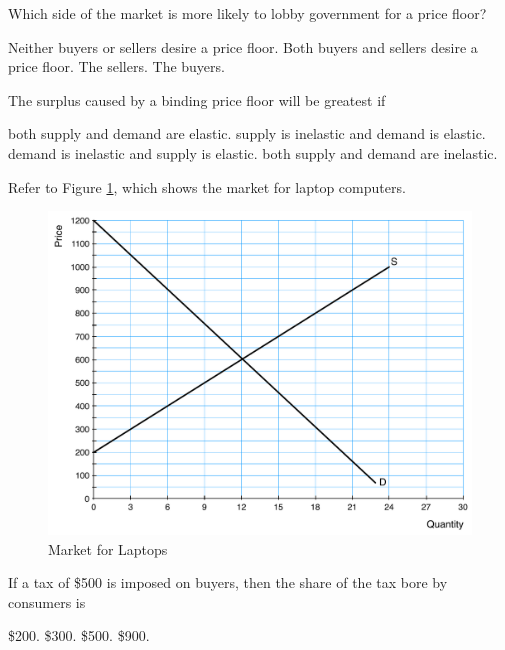\documentclass[addpoints,11pt]{exam}
\theoremstyle{definition}
\begin{document}
\begin{questions}
\question Which side of the market is more likely to lobby government for a price floor?

\begin{choices}
	\choice Neither buyers or sellers desire a price floor.
	\choice Both buyers and sellers desire a price floor.
	\CorrectChoice The sellers.
	\choice The buyers.
\end{choices}

\question The surplus caused by a binding price floor will be greatest if

\begin{choices}
	\CorrectChoice both supply and demand are elastic.
	\choice supply is inelastic and demand is elastic.
	\choice demand is inelastic and supply is elastic.
	\choice both supply and demand are inelastic.
\end{choices}
	
\question Refer to Figure \ref{MC16}, which shows the market for laptop computers.

\begin{figure}[H]
	\centering
	\includegraphics[scale=.40]{Exam1_MC16.pdf}
	\caption{Market for Laptops}
	\label{MC16}
\end{figure}

If a tax of \$500 is imposed on buyers, then the share of the tax bore by consumers is

\begin{choices}
	\choice \$200.
	\CorrectChoice \$300.
	\choice \$500.
	\choice \$900.
\end{choices}

\newpage
	

\end{questions}
\end{document}

